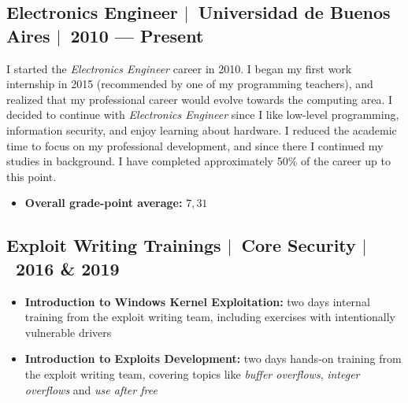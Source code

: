 \documentclass[12pt, a4paper]{article}
\newcommand{\mysep}{{\Large $\mid$}\ }
\newcommand{\titledItem}[2]{\item \textbf{#1:} #2}
\begin{document}
    \subsection*{Electronics Engineer \mysep Universidad de Buenos Aires \mysep 2010 --- Present} \label{subsec:edu1}
    I started the \emph{Electronics Engineer} career in 2010.
    I began my first work internship in 2015 (recommended by one of my programming teachers),
    and realized that my professional career would evolve towards the computing area.
    I decided to continue with \emph{Electronics Engineer}
    since I like low-level programming, information security, and enjoy learning about hardware.
    I reduced the academic time to focus on my professional development, and since there
    I continued my studies in background.
    I have completed approximately 50\% of the career up to this point.
    \begin{itemize}
        \titledItem{Overall grade-point average}{$7,31$}
    \end{itemize}

    \subsection*{Exploit Writing Trainings \mysep Core Security \mysep 2016 \& 2019} \label{subsec:edu2}
    \begin{itemize}
        \titledItem{Introduction to Windows Kernel Exploitation}{%
            two days internal training from the exploit writing team,
            including exercises with intentionally vulnerable drivers
        }
        \titledItem{Introduction to Exploits Development}{%
            two days hands-on training from the exploit writing team,
            covering topics like \emph{buffer overflows}, \emph{integer overflows} and \emph{use after free}
        }
    \end{itemize}
\end{document}
